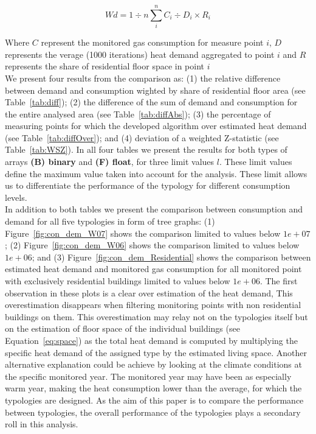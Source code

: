 \documentclass[authoryear,preprint,review,12pt]{elsarticle}
\begin{document}
\begin{linenumbers}
\begin{equation} \label{eq:diff}
Wd = 1 \div n \sum_i^n C_i \div D_i \times R_i
\end{equation} 

Where
$C$ represent the  monitored gas consumption for measure point $i$, 
$D$ represents the verage (1000 iterations) heat demand aggregated to point
$i$ and $R$ represents the share of residential floor space in point
$i$\\

We present four results from the comparison as: (1) the relative
difference between demand and consumption wighted by share of residential floor
area (see Table~\ref{tab:diff}); (2) the difference of the sum of demand and
consumption for the entire analysed area (see Table~\ref{tab:diffAbs}); (3) the
percentage of measuring points for which the developed algorithm over estimated
heat demand (see Table~\ref{tab:diffOver}); and (4) deviation of a weighted
Z-statistic (see Table~\ref{tab:WSZ}).  In all four tables we present the
results for both types of arrays \textbf{(B) binary} and \textbf{(F) float},
for three limit values $l$. These limit values define the maximum value taken
into account for the analysis. These limit allows us to differentiate the
performance of the typology for different consumption levels.\\

In addition to both tables we present the comparison between consumption and
demand for all five typologies in form of tree graphs: (1)
Figure~\ref{fig:con_dem_W07} shows the comparison limited to values below
$1e+07$; (2) Figure~\ref{fig:con_dem_W06} shows the comparison limited to
values below $1e+06$; and (3) Figure~\ref{fig:con_dem_Residential} shows the
comparison between estimated heat demand and monitored gas consumption for all
monitored point with exclusively residential buildings limited to values below
$1e+06$.  The first observation in these plots is a clear over estimation of
the heat demand, This overestimation disappears when filtering monitoring
points with non residential buildings on them. This overestimation may relay
not on the typologies itself but on the estimation of floor space of the
individual buildings (see Equation~\ref{eq:space}) as the total heat demand is
computed by multiplying the specific heat demand of the assigned type by the
estimated living space. Another alternative explanation could be achieve by
looking at the climate conditions at the specific monitored year. The monitored
year may have been as especially warm year, making the heat consumption lower
than the average, for which the typologies are designed. As the aim of this
paper is to compare the performance between typologies, the overall performance
of the typologies plays a secondary roll in this analysis.\\


\end{linenumbers}
\end{document}
